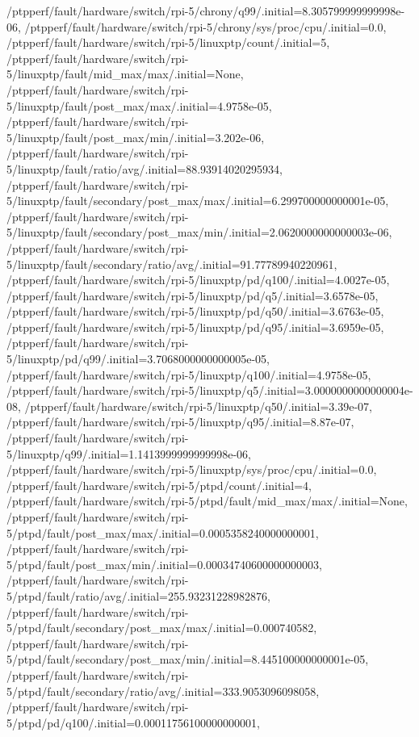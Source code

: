 {    /ptpperf/fault/hardware/switch/rpi-5/chrony/q99/.initial=8.305799999999998e-06,
    /ptpperf/fault/hardware/switch/rpi-5/chrony/sys/proc/cpu/.initial=0.0,
    /ptpperf/fault/hardware/switch/rpi-5/linuxptp/count/.initial=5,
    /ptpperf/fault/hardware/switch/rpi-5/linuxptp/fault/mid_max/max/.initial=None,
    /ptpperf/fault/hardware/switch/rpi-5/linuxptp/fault/post_max/max/.initial=4.9758e-05,
    /ptpperf/fault/hardware/switch/rpi-5/linuxptp/fault/post_max/min/.initial=3.202e-06,
    /ptpperf/fault/hardware/switch/rpi-5/linuxptp/fault/ratio/avg/.initial=88.93914020295934,
    /ptpperf/fault/hardware/switch/rpi-5/linuxptp/fault/secondary/post_max/max/.initial=6.299700000000001e-05,
    /ptpperf/fault/hardware/switch/rpi-5/linuxptp/fault/secondary/post_max/min/.initial=2.0620000000000003e-06,
    /ptpperf/fault/hardware/switch/rpi-5/linuxptp/fault/secondary/ratio/avg/.initial=91.77789940220961,
    /ptpperf/fault/hardware/switch/rpi-5/linuxptp/pd/q100/.initial=4.0027e-05,
    /ptpperf/fault/hardware/switch/rpi-5/linuxptp/pd/q5/.initial=3.6578e-05,
    /ptpperf/fault/hardware/switch/rpi-5/linuxptp/pd/q50/.initial=3.6763e-05,
    /ptpperf/fault/hardware/switch/rpi-5/linuxptp/pd/q95/.initial=3.6959e-05,
    /ptpperf/fault/hardware/switch/rpi-5/linuxptp/pd/q99/.initial=3.7068000000000005e-05,
    /ptpperf/fault/hardware/switch/rpi-5/linuxptp/q100/.initial=4.9758e-05,
    /ptpperf/fault/hardware/switch/rpi-5/linuxptp/q5/.initial=3.0000000000000004e-08,
    /ptpperf/fault/hardware/switch/rpi-5/linuxptp/q50/.initial=3.39e-07,
    /ptpperf/fault/hardware/switch/rpi-5/linuxptp/q95/.initial=8.87e-07,
    /ptpperf/fault/hardware/switch/rpi-5/linuxptp/q99/.initial=1.1413999999999998e-06,
    /ptpperf/fault/hardware/switch/rpi-5/linuxptp/sys/proc/cpu/.initial=0.0,
    /ptpperf/fault/hardware/switch/rpi-5/ptpd/count/.initial=4,
    /ptpperf/fault/hardware/switch/rpi-5/ptpd/fault/mid_max/max/.initial=None,
    /ptpperf/fault/hardware/switch/rpi-5/ptpd/fault/post_max/max/.initial=0.0005358240000000001,
    /ptpperf/fault/hardware/switch/rpi-5/ptpd/fault/post_max/min/.initial=0.00034740600000000003,
    /ptpperf/fault/hardware/switch/rpi-5/ptpd/fault/ratio/avg/.initial=255.93231228982876,
    /ptpperf/fault/hardware/switch/rpi-5/ptpd/fault/secondary/post_max/max/.initial=0.000740582,
    /ptpperf/fault/hardware/switch/rpi-5/ptpd/fault/secondary/post_max/min/.initial=8.445100000000001e-05,
    /ptpperf/fault/hardware/switch/rpi-5/ptpd/fault/secondary/ratio/avg/.initial=333.9053096098058,
    /ptpperf/fault/hardware/switch/rpi-5/ptpd/pd/q100/.initial=0.00011756100000000001,
}
